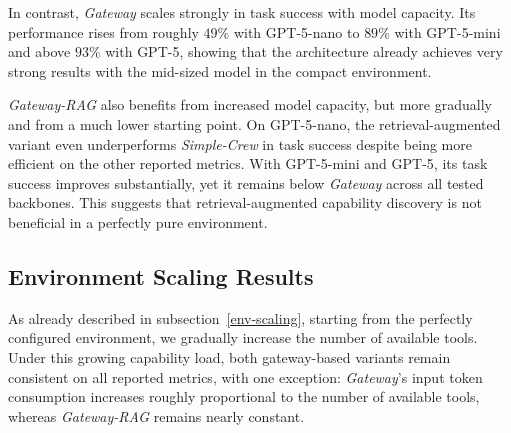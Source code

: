 In contrast, \emph{Gateway} scales strongly in task success with model capacity.
Its performance rises from roughly $49\%$ with GPT-5-nano to $89\%$ with GPT-5-mini and above $93\%$ with GPT-5, showing that the architecture already achieves very strong results with the mid-sized model in the compact environment.

\emph{Gateway-RAG} also benefits from increased model capacity, but more gradually and from a much lower starting point.
On GPT-5-nano, the retrieval-augmented variant even underperforms \emph{Simple-Crew} in task success despite being more efficient on the other reported metrics.
With GPT-5-mini and GPT-5, its task success improves substantially, yet it remains below \emph{Gateway} across all tested backbones.
This suggests that retrieval-augmented capability discovery is not beneficial in a perfectly pure environment.

\subsection{Environment Scaling Results}

As already described in subsection~\ref{env-scaling}, starting from the perfectly configured environment, we gradually increase the number of available tools.
Under this growing capability load, both gateway-based variants remain consistent on all reported metrics, with one exception:
\emph{Gateway}'s input token consumption increases roughly proportional to the number of available tools, whereas \emph{Gateway-RAG} remains nearly constant.


